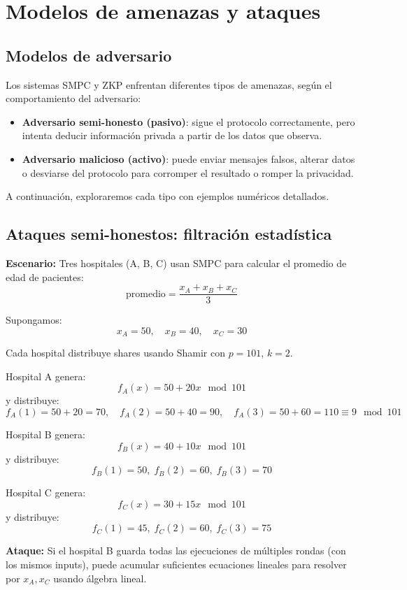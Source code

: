 \documentclass{article}
\begin{document}
\section{Modelos de amenazas y ataques}

\subsection{Modelos de adversario}

Los sistemas SMPC y ZKP enfrentan diferentes tipos de amenazas, según el comportamiento del adversario:
\begin{itemize}
    \item \textbf{Adversario semi-honesto (pasivo)}: sigue el protocolo correctamente, pero intenta deducir información privada a partir de los datos que observa.
    \item \textbf{Adversario malicioso (activo)}: puede enviar mensajes falsos, alterar datos o desviarse del protocolo para corromper el resultado o romper la privacidad.
\end{itemize}

A continuación, exploraremos cada tipo con ejemplos numéricos detallados.

\subsection{Ataques semi-honestos: filtración estadística}

\textbf{Escenario:} Tres hospitales (A, B, C) usan SMPC para calcular el promedio de edad de pacientes:
\[
\text{promedio} = \frac{x_A + x_B + x_C}{3}
\]

Supongamos:
\[
x_A = 50, \quad x_B = 40, \quad x_C = 30
\]

Cada hospital distribuye shares usando Shamir con \( p = 101 \), \( k = 2 \).

Hospital A genera:
\[
f_A(x) = 50 + 20x \mod 101
\]
y distribuye:
\[
f_A(1) = 50 + 20 = 70, \quad f_A(2) = 50 + 40 = 90, \quad f_A(3) = 50 + 60 = 110 \equiv 9 \mod 101
\]

Hospital B genera:
\[
f_B(x) = 40 + 10x \mod 101
\]
y distribuye:
\[
f_B(1) = 50, \; f_B(2) = 60, \; f_B(3) = 70
\]

Hospital C genera:
\[
f_C(x) = 30 + 15x \mod 101
\]
y distribuye:
\[
f_C(1) = 45, \; f_C(2) = 60, \; f_C(3) = 75
\]

\textbf{Ataque:} Si el hospital B guarda todas las ejecuciones de múltiples rondas (con los mismos inputs), puede acumular suficientes ecuaciones lineales para resolver por \( x_A, x_C \) usando álgebra lineal.
\end{document}
